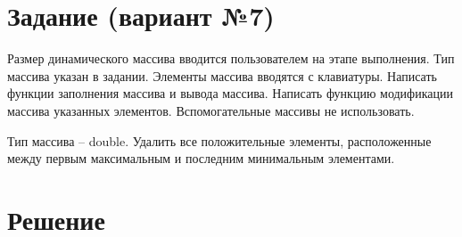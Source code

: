 \documentclass[12pt]{article}
\begin{document}
\section*{Задание (вариант №7)}
Размер динамического массива вводится пользователем на этапе выполнения. Тип
массива указан в задании. Элементы массива вводятся с клавиатуры. Написать функции
заполнения массива и вывода массива. Написать функцию модификации массива
указанных элементов. Вспомогательные массивы не использовать.

Тип массива -- double. Удалить все положительные элементы, расположенные между первым
максимальным и последним минимальным элементами.

\newpage


\section*{Решение}

\end{document}
